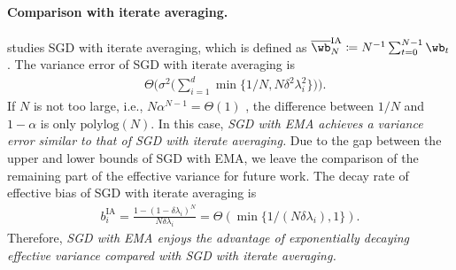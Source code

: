 \documentclass[11pt]{article}
\newcommand{\owb}{\overline{\wb}}
\begin{document}
\paragraph{Comparison with iterate averaging.}
\citet{zou2021benign} studies SGD with iterate averaging, which is defined as
$\owb_N^{\mathrm{IA}}\coloneqq N^{-1}\sum_{t=0}^{N-1}\wb_t$.
The variance error of SGD with iterate averaging is
\begin{align*}
&\Theta\bigg(\sigma^2\bigg(\sum_{i=1}^d\min\{1/N, N\delta^2\lambda_i^2\}\bigg)\bigg).
\end{align*}
If $N$ is not too large, i.e., $N\alpha^{N-1}=\Theta(1)$ , the difference between $1/N$ and $1-\alpha$ is only $\mathrm{polylog}(N)$.
In this case, \emph{SGD with EMA achieves a variance error similar to that of SGD with iterate averaging.}
Due to the gap between the upper and lower bounds of SGD with EMA, we leave the comparison of the remaining part of the effective variance for future work.
The decay rate of effective bias of SGD with iterate averaging is 
\begin{align*}
b_i^{\mathrm{IA}}=\frac{1-(1-\delta\lambda_i)^N}{N\delta\lambda_i}=\Theta(\min\{1/(N\delta\lambda_i), 1\}).
\end{align*}
Therefore, \emph{SGD with EMA enjoys the advantage of exponentially decaying effective variance compared with SGD with iterate averaging.}
\end{document}
